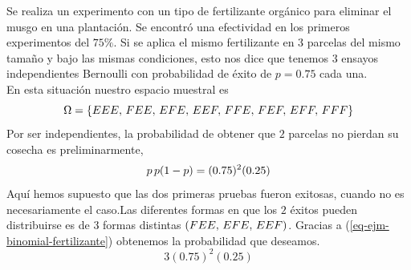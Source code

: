 \begin{Ejm}
    Se realiza un experimento con un tipo de fertilizante orgánico para eliminar el musgo en una plantación. Se encontró una efectividad en los primeros experimentos del $75\%$.
    Si se aplica el mismo fertilizante en $3$ parcelas del mismo tamaño y bajo las mismas condiciones, esto nos dice que tenemos $3$ ensayos independientes Bernoulli con probabilidad de éxito de $p=0.75$  cada una.\\
    En esta situación nuestro espacio muestral es $$\Omega= \{E E E,\thinspace F E E,\thinspace E F E,\thinspace E E F,\thinspace F F E,\thinspace F E F,\thinspace E F F,\thinspace F F F\}$$
    Por ser independientes, la probabilidad de obtener que $2$ parcelas no pierdan su cosecha es preliminarmente,
    \begin{eqnarray}
        \label{eq-ejm-binomial-fertilizante}
    	p\thinspace p (1-p)=(0.75)^2(0.25)
    \end{eqnarray}
    Aquí hemos supuesto que las dos primeras pruebas fueron exitosas, cuando no es necesariamente el caso.Las diferentes formas en que los $2$ éxitos pueden distribuirse es de $3$ formas distintas $(F E E,\thinspace E F E,\thinspace E E F)$. Gracias a (\ref{eq-ejm-binomial-fertilizante}) obtenemos la probabilidad que deseamos. $$3(0.75)^2(0.25)$$
\end{Ejm}


